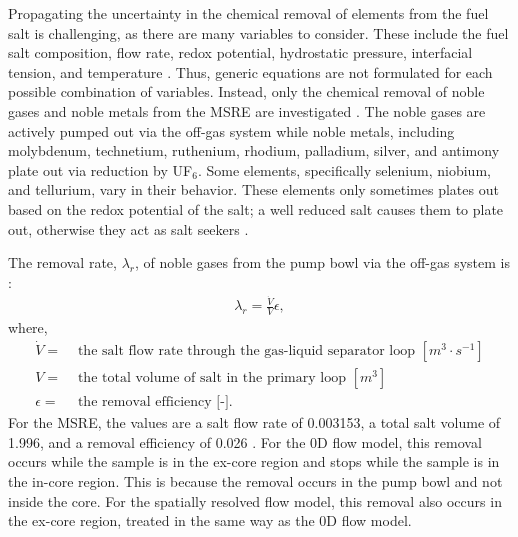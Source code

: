 Propagating the uncertainty in the chemical removal of elements from the fuel salt is challenging, as there are many variables to consider.
These include the fuel salt composition, flow rate, redox potential, hydrostatic pressure, interfacial tension, and temperature \cite{shahbazi2022survey, thoma1971chemical}.
Thus, generic equations are not formulated for each possible combination of variables.
Instead, only the chemical removal of noble gases and noble metals from the \gls{MSRE} are investigated \cite{lo2022application}.
The noble gases are actively pumped out via the off-gas system while noble metals, including molybdenum, technetium, ruthenium, rhodium, palladium, silver, and antimony plate out via reduction by UF$_6$.
Some elements, specifically selenium, niobium, and tellurium, vary in their behavior.
These elements only sometimes plates out based on the redox potential of the salt; a well reduced salt causes them to plate out, otherwise they act as salt seekers \cite{kedl1972migration, lo2022application}.

The removal rate, $\lambda_r$, of noble gases from the pump bowl via the off-gas system is \cite{jr2020modeling, lo2022application}:
\begin{align}
    \lambda_r = \frac{\dot{V}}{V} \epsilon,
\end{align}
where,
\begin{align}
    \dot{V} =& \text{ the salt flow rate through the gas-liquid separator loop $[m^3 \cdot s^{-1}]$} \nonumber \\
    V =& \text{ the total volume of salt in the primary loop $[m^3]$} \nonumber \\
    \epsilon =& \text{ the removal efficiency [-]}. \nonumber
\end{align}
For the \gls{MSRE}, the values are a salt flow rate of 0.003153, a total salt volume of 1.996, and a removal efficiency of 0.026 \cite{robertson1965msre}.
For the 0D flow model, this removal occurs while the sample is in the ex-core region and stops while the sample is in the in-core region.
This is because the removal occurs in the pump bowl and not inside the core.
For the spatially resolved flow model, this removal also occurs in the ex-core region, treated in the same way as the 0D flow model.

